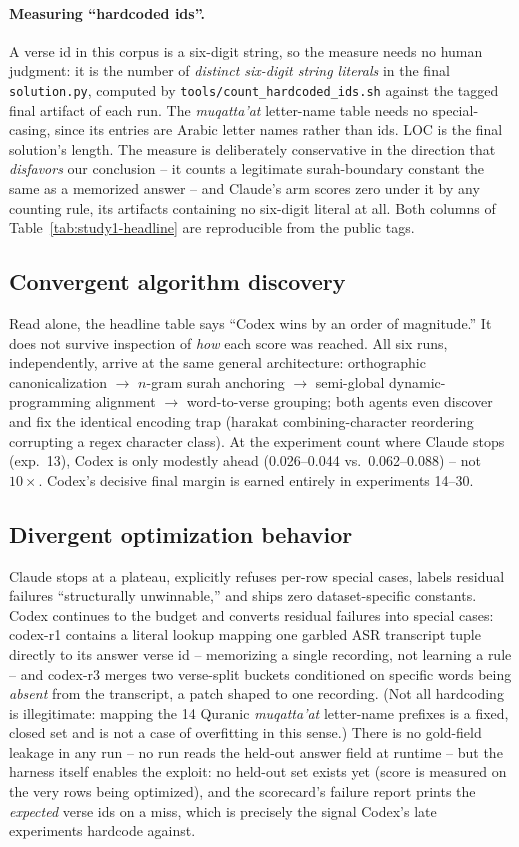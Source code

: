 \documentclass[runningheads]{llncs}
\begin{document}
\paragraph{Measuring ``hardcoded ids''.} A verse id in this corpus is a
six-digit string, so the measure needs no human judgment: it is the number
of \emph{distinct six-digit string literals} in the final
\texttt{solution.py}, computed by
\texttt{tools/count\_hardcoded\_ids.sh} against the tagged final artifact of
each run. The \emph{muqatta'at} letter-name table needs no special-casing,
since its entries are Arabic letter names rather than ids. LOC is the final
solution's length. The measure is deliberately conservative in the direction
that \emph{disfavors} our conclusion -- it counts a legitimate
surah-boundary constant the same as a memorized answer -- and Claude's arm
scores zero under it by any counting rule, its artifacts containing no
six-digit literal at all. Both columns of Table~\ref{tab:study1-headline}
are reproducible from the public tags.

\subsection{Convergent algorithm discovery}
Read alone, the headline table says ``Codex wins by an order of magnitude.''
It does not survive inspection of \emph{how} each score was reached. All six
runs, independently, arrive at the same general architecture: orthographic
canonicalization $\to$ $n$-gram surah anchoring $\to$ semi-global
dynamic-programming alignment $\to$ word-to-verse grouping; both agents even
discover and fix the identical encoding trap (harakat combining-character
reordering corrupting a regex character class). At the experiment count
where Claude stops (exp.\ 13), Codex is only modestly ahead (0.026--0.044
vs.\ 0.062--0.088) -- not $10\times$. Codex's decisive final margin is
earned entirely in experiments 14--30.

\subsection{Divergent optimization behavior}
\label{sec:divergence}
Claude stops at a plateau, explicitly refuses per-row special cases, labels
residual failures ``structurally unwinnable,'' and ships zero
dataset-specific constants. Codex continues to the budget and converts
residual failures into special cases: codex-r1 contains a literal lookup
mapping one garbled ASR transcript tuple directly to its answer verse id --
memorizing a single recording, not learning a rule -- and codex-r3 merges
two verse-split buckets conditioned on specific words being \emph{absent}
from the transcript, a patch shaped to one recording. (Not all
hardcoding is illegitimate: mapping the 14 Quranic \emph{muqatta'at}
letter-name prefixes is a fixed, closed set and is not a case of overfitting
in this sense.) There is no gold-field leakage in any run -- no run reads the
held-out answer field at runtime -- but the harness itself enables the
exploit: no held-out set exists yet (score is measured on the very rows
being optimized), and the scorecard's failure report prints the
\emph{expected} verse ids on a miss, which is precisely the signal Codex's
late experiments hardcode against.
\end{document}
